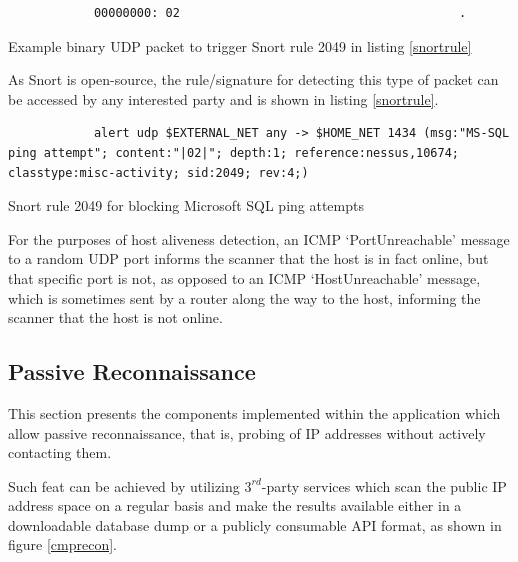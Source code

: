 \documentclass[a4paper,12pt]{article}
\begin{document}
	\begin{listing}[H]
		\begin{verbatim}
			00000000: 02                                       .
		\end{verbatim}
		\caption{Example binary UDP packet to trigger Snort rule 2049 in listing \ref{snortrule}}
		\label{mssqlsnort}
	\end{listing}
	
	As Snort is open-source, the rule/signature for detecting this type of packet can be accessed by any interested party and is shown in listing \ref{snortrule}.
	
	\begin{listing}[H]
		\begin{verbatim}
			alert udp $EXTERNAL_NET any -> $HOME_NET 1434 (msg:"MS-SQL ping attempt"; content:"|02|"; depth:1; reference:nessus,10674; classtype:misc-activity; sid:2049; rev:4;)
		\end{verbatim}
		\caption[Snort rule 2049 for blocking Microsoft SQL ping attempts]{Snort rule 2049 for blocking Microsoft SQL ping attempts\cite{snort49}}
		\label{snortrule}
	\end{listing}
	
	For the purposes of host aliveness detection, an ICMP `PortUnreachable' message to a random UDP port informs the scanner that the host is in fact online, but that specific port is not, as opposed to an ICMP `HostUnreachable' message, which is sometimes sent by a router along the way to the host, informing the scanner that the host is not online.

\subsection{Passive Reconnaissance} \label{passive}
 

	This section presents the components implemented within the application which allow passive reconnaissance, that is, probing of IP addresses without actively contacting them.
	
	Such feat can be achieved by utilizing $3^{rd}$-party services which scan the public IP address space on a regular basis and make the results available either in a downloadable database dump or a publicly consumable API format, as shown in figure \ref{cmprecon}.
\end{document}
